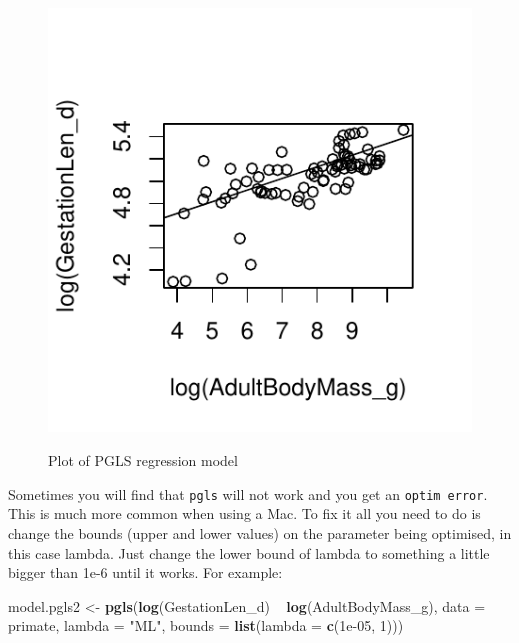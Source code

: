 \documentclass[12pt]{article}
\newcommand{\KeywordTok}[1]{\textcolor[rgb]{0.13,0.29,0.53}{\textbf{{#1}}}}
\newcommand{\DataTypeTok}[1]{\textcolor[rgb]{0.13,0.29,0.53}{{#1}}}
\newcommand{\DecValTok}[1]{\textcolor[rgb]{0.00,0.00,0.81}{{#1}}}
\newcommand{\FloatTok}[1]{\textcolor[rgb]{0.00,0.00,0.81}{{#1}}}
\newcommand{\StringTok}[1]{\textcolor[rgb]{0.31,0.60,0.02}{{#1}}}
\newcommand{\NormalTok}[1]{{#1}}
\begin{document}
\begin{figure}[H]
\centering
\includegraphics[width = 12cm, height = 12cm, keepaspectratio=true]{PGLSplot.pdf}
\caption{Plot of PGLS regression model}
\label{figure}
\end{figure}

\begin{framed}
Sometimes you will find that \texttt{pgls} will not work and you get an \texttt{optim error}. This is much more common when using a Mac. To fix it all you need to do is change the bounds (upper and lower values) on the parameter being optimised, in this case lambda. Just change the lower bound of lambda to something a little bigger than 1e-6 until it works. For example:

\begin{snugshade}
\begin{Highlighting}[]
\NormalTok{model.pgls2 <-}\StringTok{ }\KeywordTok{pgls}\NormalTok{(}\KeywordTok{log}\NormalTok{(GestationLen_d) ~}\StringTok{ }\KeywordTok{log}\NormalTok{(AdultBodyMass_g), }
                    \DataTypeTok{data =} \NormalTok{primate, }\DataTypeTok{lambda =} \StringTok{"ML"}\NormalTok{, }
                    \DataTypeTok{bounds =} \KeywordTok{list}\NormalTok{(}\DataTypeTok{lambda =} \KeywordTok{c}\NormalTok{(}\FloatTok{1e-05}\NormalTok{, }\DecValTok{1}\NormalTok{)))}
\end{Highlighting}
\end{snugshade}
\end{framed}
\end{document}
